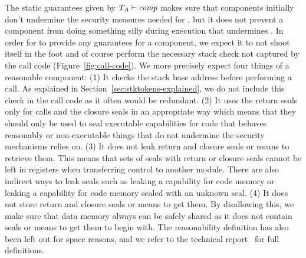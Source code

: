 \documentclass[acmsmall,review,anonymous]{acmart}\settopmatter{printfolios=true,printccs=false,printacmref=false}
\renewcommand{\comp}{\var{comp}}
\newcommand{\wdjud}[2][ ]{#1 \vdash #2}
\begin{document}
The static guarantees given by $\wdjud[\ta]{\comp}$ makes sure that components initially don't undermine the security measures needed for \stktokens{}, but it does not prevent a component from doing something silly during execution that undermines \stktokens{}.
In order for \stktokens{} to provide any guarantees for a component, we expect it to not shoot itself in the foot and of course perform the necessary stack check not captured by the call code (Figure~\ref{fig:call-code}).
We more precisely expect four things of a reasonable component: (1) It checks the stack base address before performing a call.
As explained in Section~\ref{sec:stktokens-explained}, we do not include this check in the call code as it often would be redundant.
(2) It uses the return seals only for calls and the closure seals in an appropriate way which means that they should only be used to seal executable capabilities for code that behaves reasonably or non-executable things that do not undermine the security mechanisms \stktokens{} relies on.
(3) It does not leak return and closure seals or means to retrieve them.
This means that sets of seals with return or closure seals cannot be left in registers when transferring control to another module.
There are also indirect ways to leak seals such as leaking a capability for code memory or leaking a capability for code memory sealed with an unknown seal.
(4) It does not store return and closure seals or means to get them.
By disallowing this, we make sure that data memory always can be safely shared as it does not contain seals or means to get them to begin with.
The reasonability definition has also been left out for space reasons, and we refer to the technical report~\citep{technical_report} for full definitions.


\end{document}
